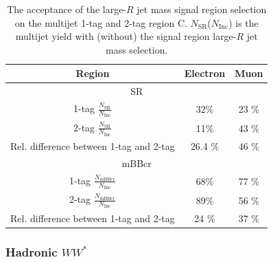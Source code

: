\begin{table}[!htbp]
\begin{center}
\begin{tabular}{c|c|c}
\hline
Region    & Electron          & Muon      \\
\hline
\multicolumn{3}{c}{SR} \\
\hline
1-tag $\frac{N_\text{SR}}{N_\text{Inc}}$ &  32\% & 23 \% \\
2-tag $\frac{N_\text{SR}}{N_\text{Inc}}$ &  11\% & 43 \% \\
\hline \hline
Rel. difference between 1-tag and 2-tag & 26.4 \% & 46 \% \\
\hline
\multicolumn{3}{c}{mBBcr} \\
\hline
1-tag $\frac{N_\text{mBBcr}}{N_\text{Inc}}$ &  68\% & 77 \% \\
2-tag $\frac{N_\text{mBBcr}}{N_\text{Inc}}$ &  89\% & 56 \% \\
\hline \hline
Rel. difference between 1-tag and 2-tag &  24 \% &   37 \% \\
\end{tabular}
\end{center}
\caption{The acceptance of the large-$R$ jet mass signal region selection on the multijet
1-tag and 2-tag region C. $N_\text{SR}$($N_\text{Inc}$) is the multijet yield
with (without) the signal region large-$R$ jet mass selection.}
\label{tab:boosted_syst_qcd_norm_mBBAcc}
\end{table}
 



\subsubsection{Hadronic ${WW^{*}}$ \pt}